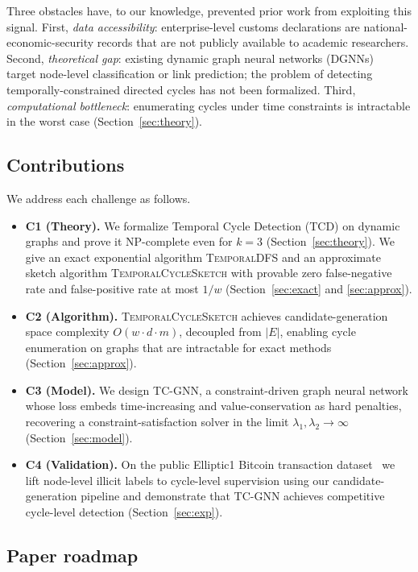 \documentclass[journal,onecolumn]{IEEEtran}
\begin{document}
Three obstacles have, to our knowledge, prevented prior work from
exploiting this signal. First, \emph{data accessibility}: enterprise-level
customs declarations are national-economic-security records that are not
publicly available to academic researchers. Second, \emph{theoretical gap}:
existing dynamic graph neural networks (DGNNs)~\cite{tgn2020,dcrnn2018,
evolvegcn2020} target node-level classification or link prediction; the
problem of detecting temporally-constrained directed cycles has not been
formalized. Third, \emph{computational bottleneck}: enumerating cycles
under time constraints is intractable in the worst case (Section~\ref{sec:theory}).

\subsection{Contributions}
\label{sec:intro-contrib}

We address each challenge as follows.
\begin{itemize}
\item \textbf{C1 (Theory).} We formalize Temporal Cycle Detection (TCD) on
dynamic graphs and prove it NP-complete even for $k=3$ (Section~\ref{sec:theory}).
We give an exact exponential algorithm \textsc{TemporalDFS} and an
approximate sketch algorithm \textsc{TemporalCycleSketch} with provable
zero false-negative rate and false-positive rate at most $1/w$
(Section~\ref{sec:exact} and \ref{sec:approx}).
\item \textbf{C2 (Algorithm).} \textsc{TemporalCycleSketch} achieves
candidate-generation space complexity $O(w \cdot d \cdot m)$, decoupled
from $|E|$, enabling cycle enumeration on graphs that are intractable for
exact methods (Section~\ref{sec:approx}).
\item \textbf{C3 (Model).} We design \textsc{TC-GNN}, a constraint-driven
graph neural network whose loss embeds time-increasing and value-conservation
as hard penalties, recovering a constraint-satisfaction solver in the limit
$\lambda_1, \lambda_2 \to \infty$ (Section~\ref{sec:model}).
\item \textbf{C4 (Validation).} On the public Elliptic1 Bitcoin transaction
dataset~\cite{ellipticData2019} we lift node-level illicit labels to
cycle-level supervision using our candidate-generation pipeline and
demonstrate that TC-GNN achieves competitive cycle-level detection
(Section~\ref{sec:exp}).
\end{itemize}

\subsection{Paper roadmap}
\label{sec:intro-roadmap}
\end{document}
